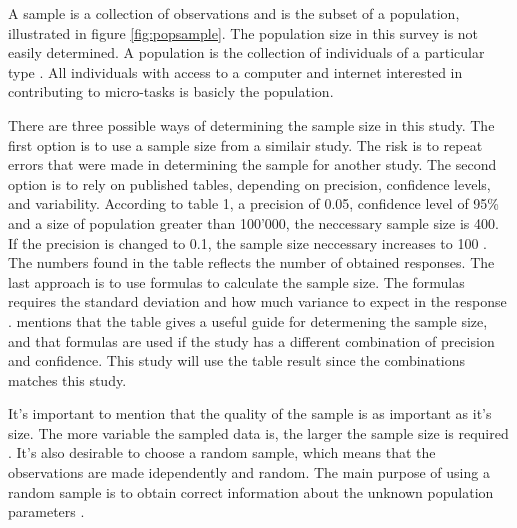 A sample is a collection of observations and is the subset of a population, illustrated in figure \ref{fig:popsample}. The population size in this survey is not easily determined. A population is the collection of individuals of a particular type \citep{Walpole2012}. All individuals with access to a computer and internet interested in contributing to micro-tasks is basicly the population. 

There are three possible ways of determining the sample size in this study. The first option is to use a sample size from a similair study. The risk is to repeat errors that were made in determining the sample for another study. The second option is to rely on published tables, depending on precision, confidence levels, and variability. According to \cite{Israel1992} table 1, a precision of 0.05, confidence level of 95\% and a size of population greater than 100'000, the neccessary sample size is 400. If the precision is changed to 0.1, the sample size neccessary increases to 100 \citep{Israel1992}. The numbers found in the table reflects the number of obtained responses. The last approach is to use formulas to calculate the sample size. The formulas requires the standard deviation and how much variance to expect in the response \citep{Smith2013}\citep{Israel1992}. \cite{Israel1992} mentions that the table gives a useful guide for determening the sample size, and that formulas are used if the study has a different combination of precision and confidence. This study will use the table result since the combinations matches this study.

It's important to mention that the quality of the sample is as important as it's size. The more variable the sampled data is, the larger the sample size is required \citep{Israel1992}. It's also desirable to choose a random sample, which means that the observations are made idependently and random. The main purpose of using a random sample is to obtain correct information about the unknown population parameters \citep{Walpole2012}. 



